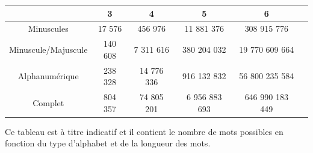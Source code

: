 \documentclass[french,12pt]{article}
\begin{document}
   \begin{tabular}{|c|c|c|c|c|c|}
        \hline
         & 3 & 4 & 5 & 6 \\
         \hline
         Minuscules & 17 576 & 456 976 & 11 881 376 & 308 915 776 \\
         \hline
         Minuscule/Majuscule & 140 608 & 7 311 616 & 380 204 032 & 19 770 609 664 \\
         \hline
         Alphanumérique & 238 328 & 14 776 336 & 916 132 832 & 56 800 235 584\\
         \hline
         Complet & 804 357 & 74 805 201 & 6 956 883 693 & 646 990 183 449 \\
         \hline
         
    \end{tabular}

    Ce tableau est à titre indicatif et il contient le nombre de mots possibles en fonction du type d'alphabet et de la longueur des mots. 
\end{document}
